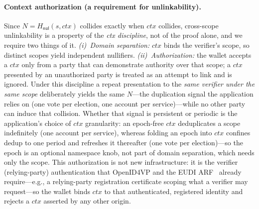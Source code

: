 \documentclass[11pt]{article}
\theoremstyle{plain}
\theoremstyle{definition}
\begin{document}
\paragraph{Context authorization (a requirement for unlinkability).} Since
$N=H_{\mathsf{nul}}(s,\mathit{ctx})$ collides exactly when $\mathit{ctx}$ collides,
cross-scope unlinkability is a property of the \emph{ctx discipline}, not of the proof
alone, and we require two things of it. \emph{(i)~Domain separation:} $\mathit{ctx}$
binds the verifier's scope, so distinct scopes yield independent nullifiers.
\emph{(ii)~Authorization:} the wallet accepts a $\mathit{ctx}$ only from a party that
can demonstrate authority over that scope; a $\mathit{ctx}$ presented by an unauthorized
party is treated as an attempt to link and is ignored. Under this discipline a repeat
presentation to the \emph{same verifier under the same scope} deliberately yields the
same $N$---the duplication signal the application relies on (one vote per election, one
account per service)---while no other party can induce that collision. Whether that
signal is persistent or periodic is the application's choice of $\mathit{ctx}$
granularity: an epoch-free $\mathit{ctx}$ deduplicates a scope indefinitely (one account
per service), whereas folding an epoch into $\mathit{ctx}$ confines dedup to one period
and refreshes it thereafter (one vote per election)---so the epoch is an optional
namespace knob, not part of domain separation, which needs only the scope. This
authorization is not new infrastructure: it is the verifier (relying-party)
authentication that OpenID4VP and the EUDI ARF~\cite{eudi-arf} already require---e.g., a
relying-party registration certificate scoping what a verifier may request---so the
wallet binds $\mathit{ctx}$ to that authenticated, registered identity and rejects a
$\mathit{ctx}$ asserted by any other origin.
\end{document}
